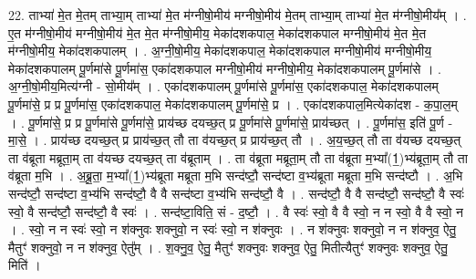 \documentclass[17pt]{extarticle}
\begin{document}
22. ताभ्या॑ मे॒त मे॒तम् ताभ्या॒म् ताभ्या॑ मे॒त म॑ग्नीषो॒मीय॑ मग्नीषो॒मीय॑ मे॒तम् ताभ्या॒म् ताभ्या॑ मे॒त म॑ग्नीषो॒मीय᳚म् । . ए॒त म॑ग्नीषो॒मीय॑ मग्नीषो॒मीय॑ मे॒त मे॒त म॑ग्नीषो॒मीय॒ मेका॑दशकपाल॒ मेका॑दशकपाल मग्नीषो॒मीय॑ मे॒त मे॒त म॑ग्नीषो॒मीय॒ मेका॑दशकपालम् । . अ॒ग्नी॒षो॒मीय॒ मेका॑दशकपाल॒ मेका॑दशकपाल मग्नीषो॒मीय॑ मग्नीषो॒मीय॒ मेका॑दशकपालम् पू॒र्णमा॑से पू॒र्णमा॑स॒ एका॑दशकपाल मग्नीषो॒मीय॑ मग्नीषो॒मीय॒ मेका॑दशकपालम् पू॒र्णमा॑से । . अ॒ग्नी॒षो॒मीय॒मित्य॑ग्नी - सो॒मीय᳚म् । . एका॑दशकपालम् पू॒र्णमा॑से पू॒र्णमा॑स॒ एका॑दशकपाल॒ मेका॑दशकपालम् पू॒र्णमा॑से॒ प्र प्र पू॒र्णमा॑स॒ एका॑दशकपाल॒ मेका॑दशकपालम् पू॒र्णमा॑से॒ प्र । . एका॑दशकपाल॒मित्येका॑दश - क॒पा॒ल॒म् । . पू॒र्णमा॑से॒ प्र प्र पू॒र्णमा॑से पू॒र्णमा॑से॒ प्राय॑च्छ दयच्छ॒त् प्र पू॒र्णमा॑से पू॒र्णमा॑से॒ प्राय॑च्छत् । . पू॒र्णमा॑स॒ इति॑ पू॒र्ण - मा॒से॒ । . प्राय॑च्छ दयच्छ॒त् प्र प्राय॑च्छ॒त् तौ ता व॑यच्छ॒त् प्र प्राय॑च्छ॒त् तौ । . अ॒य॒च्छ॒त् तौ ता व॑यच्छ दयच्छ॒त् ता व॑ब्रूता मब्रूता॒म् ता व॑यच्छ दयच्छ॒त् ता व॑ब्रूताम् । . ता व॑ब्रूता मब्रूता॒म् तौ ता व॑ब्रूता म॒भ्या᳚(1॒)भ्य॑ब्रूता॒म् तौ ता व॑ब्रूता म॒भि । . अ॒ब्रू॒ता॒ म॒भ्या᳚(1॒)भ्य॑ब्रूता मब्रूता म॒भि सन्द॑ष्टौ॒ सन्द॑ष्टा व॒भ्य॑ब्रूता मब्रूता म॒भि सन्द॑ष्टौ । . अ॒भि सन्द॑ष्टौ॒ सन्द॑ष्टा व॒भ्य॑भि सन्द॑ष्टौ॒ वै वै सन्द॑ष्टा व॒भ्य॑भि सन्द॑ष्टौ॒ वै । . सन्द॑ष्टौ॒ वै वै सन्द॑ष्टौ॒ सन्द॑ष्टौ॒ वै स्वः॑ स्वो॒ वै सन्द॑ष्टौ॒ सन्द॑ष्टौ॒ वै स्वः॑ । . सन्द॑ष्टा॒विति॒ सं - द॒ष्टौ॒ । . वै स्वः॑ स्वो॒ वै वै स्वो॒ न न स्वो॒ वै वै स्वो॒ न । . स्वो॒ न न स्वः॑ स्वो॒ न श॑क्नुवः शक्नुवो॒ न स्वः॑ स्वो॒ न श॑क्नुवः । . न श॑क्नुवः शक्नुवो॒ न न श॑क्नुव॒ ऐतु॒ मैतुꣳ॑ शक्नुवो॒ न न श॑क्नुव॒ ऐतु᳚म् । . श॒क्नु॒व॒ ऐतु॒ मैतुꣳ॑ शक्नुवः शक्नुव॒ ऐतु॒ मितीत्यैतुꣳ॑ शक्नुवः शक्नुव॒ ऐतु॒ मिति॑ । \newline
\end{document}
